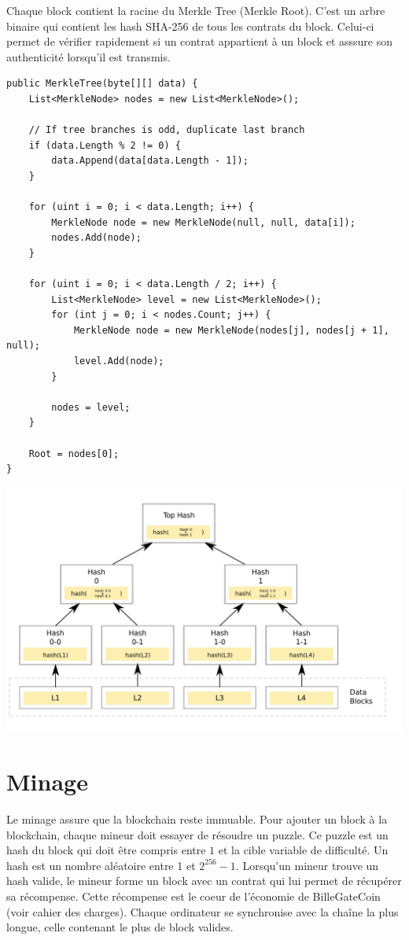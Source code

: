 \documentclass{article}
\begin{document}
Chaque block contient la racine du Merkle Tree (Merkle Root). C'est un arbre binaire qui contient les hash SHA-256 de tous les contrats du block. Celui-ci permet de vérifier rapidement si un contrat appartient à un block et asssure son authenticité lorsqu'il est transmis.

\begin{verbatim}
public MerkleTree(byte[][] data) {
    List<MerkleNode> nodes = new List<MerkleNode>();
    
    // If tree branches is odd, duplicate last branch
    if (data.Length % 2 != 0) {
        data.Append(data[data.Length - 1]);
    }

    for (uint i = 0; i < data.Length; i++) {
        MerkleNode node = new MerkleNode(null, null, data[i]);
        nodes.Add(node);
    }

    for (uint i = 0; i < data.Length / 2; i++) {
        List<MerkleNode> level = new List<MerkleNode>();
        for (int j = 0; i < nodes.Count; j++) {
            MerkleNode node = new MerkleNode(nodes[j], nodes[j + 1], null);
            level.Add(node);
        }

        nodes = level;
    }

    Root = nodes[0];
}
\end{verbatim}

\begin{center}
\includegraphics[width=0.8\linewidth]{report/merkle.png}\\
\end{center}

\section{Minage}
Le minage assure que la blockchain reste immuable. Pour ajouter un block à la blockchain, chaque mineur doit essayer de résoudre un puzzle. Ce puzzle est un hash du block qui doit être compris entre $1$ et la cible variable de difficulté. Un hash est un nombre aléatoire entre 1 et $2^{256} - 1$. Lorsqu'un mineur trouve un hash valide, le mineur forme un block avec un contrat qui lui permet de récupérer sa récompense. Cette récompense est le coeur de l'économie de BilleGateCoin (voir cahier des charges). Chaque ordinateur se synchronise avec la chaîne la plus longue, celle contenant le plus de block valides.
\end{document}
